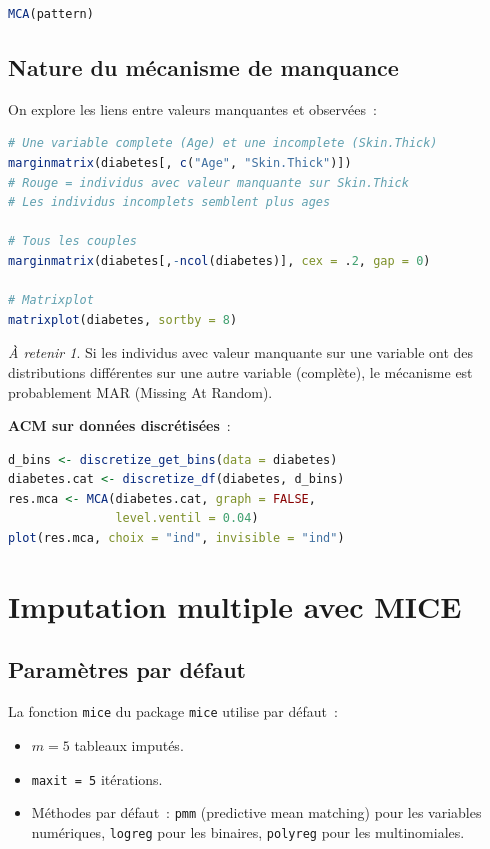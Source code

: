 \documentclass[a4paper,11pt]{article}
\theoremstyle{definition}
\theoremstyle{remark}
\newtheorem*{important}{\`A retenir}
\begin{document}
\begin{lstlisting}[language=R]
MCA(pattern)
\end{lstlisting}

\subsection{Nature du m\'ecanisme de manquance}

On explore les liens entre valeurs manquantes et observ\'ees~:

\begin{lstlisting}[language=R]
# Une variable complete (Age) et une incomplete (Skin.Thick)
marginmatrix(diabetes[, c("Age", "Skin.Thick")])
# Rouge = individus avec valeur manquante sur Skin.Thick
# Les individus incomplets semblent plus ages

# Tous les couples
marginmatrix(diabetes[,-ncol(diabetes)], cex = .2, gap = 0)

# Matrixplot
matrixplot(diabetes, sortby = 8)
\end{lstlisting}

\begin{important}
  Si les individus avec valeur manquante sur une variable ont des
  distributions diff\'erentes sur une autre variable (compl\`ete),
  le m\'ecanisme est probablement MAR (Missing At Random).
\end{important}

\textbf{ACM sur donn\'ees discr\'etis\'ees}~:

\begin{lstlisting}[language=R]
d_bins <- discretize_get_bins(data = diabetes)
diabetes.cat <- discretize_df(diabetes, d_bins)
res.mca <- MCA(diabetes.cat, graph = FALSE,
               level.ventil = 0.04)
plot(res.mca, choix = "ind", invisible = "ind")
\end{lstlisting}

\section{Imputation multiple avec MICE}

\subsection{Param\`etres par d\'efaut}

La fonction \texttt{mice} du package \texttt{mice} utilise par
d\'efaut~:
\begin{itemize}
  \item $m = 5$ tableaux imput\'es.
  \item \texttt{maxit = 5} it\'erations.
  \item M\'ethodes par d\'efaut~: \texttt{pmm} (predictive mean
    matching) pour les variables num\'eriques, \texttt{logreg} pour
    les binaires, \texttt{polyreg} pour les multinomiales.
\end{itemize}
\end{document}
